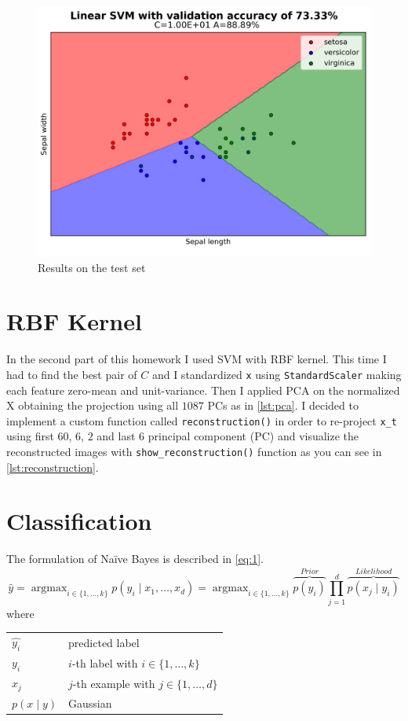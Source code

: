 \documentclass[a4paper, 11pt]{article}
\makeatletter
\DeclareMathOperator*{\argmax}{argmax} %
\newenvironment{conditions}
{\par\vspace{\abovedisplayskip}\noindent\begin{tabular}{>{$}l<{$} @{${}={}$} l}}
	{\end{tabular}\par\vspace{\belowdisplayskip}}
\makeatother
\begin{document}
	\begin{figure}[ht!]
		\centering
		\includegraphics[width=0.7\paperwidth]{img/fig01c.png}
		\caption{Results on the test set}
		\label{fig:linear3}
	\end{figure}
		
	\section{RBF Kernel}
	
	In the second part of this homework I used SVM with RBF kernel. This time I had to find the best pair of $C$ and
	I standardized \texttt{x} using \texttt{StandardScaler} making each feature zero-mean and unit-variance. Then I applied PCA on the normalized X obtaining the projection using all $1087$ PCs as in \vref{lst:pca}.
	I decided to implement a custom function called \texttt{reconstruction()} in order to re-project \texttt{x\_t} using first $60$, $6$, $2$ and last $6$ principal component (PC) and visualize the reconstructed images with \texttt{show\_reconstruction()} function as you can see in \vref{lst:reconstruction}.
	
	
	
	\FloatBarrier
	
	\section{Classification}
		
	The formulation of Na\"ive Bayes is described in \cref{eq:1}.
	\begin{equation} \label{eq:1}
		\hat{y}=\argmax_{i \in \{1,\dots,k\}} p ( y_i \mid x_1, \dots, x_d) = \argmax_{i \in \{1,\dots,k\}}\overbrace{p(y_i)}^{Prior} \prod_{j=1}^{d}\overbrace{p(x_j\mid y_i)}^{Likelihood}
	\end{equation}
	where
	\begin{conditions}
		\hat{y_i}	&	predicted label \\
		y_i			&	$i$-th label with $i \in \{1,\dots,k\}$\\
		x_j			&  	$j$-th example with $j \in \{1,\dots,d\}$   \\   
		p(x\mid y) 	&	Gaussian
	\end{conditions}
	
\end{document}
